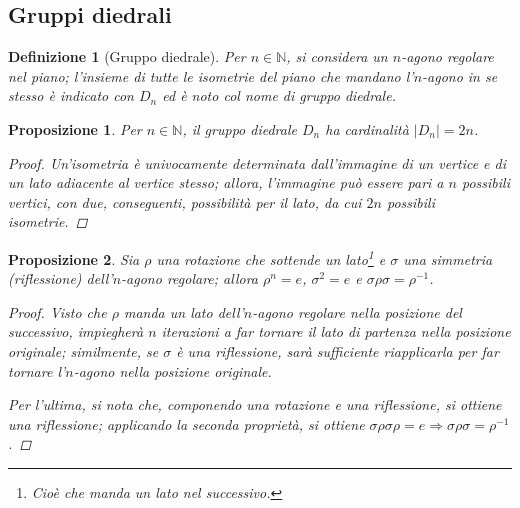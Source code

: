 \documentclass[11pt]{scrartcl}
\theoremstyle{style1}
\newtheorem{prop}{Proposizione}[section]
\newtheorem{definizione}{Definizione}[section]
\numberwithin{equation}{subsection}
\begin{document}
\subsection{Gruppi diedrali}
\begin{definizione}
	[Gruppo diedrale]
	Per $n \in \mathbb{N}$, si considera un $n$-agono regolare nel piano; l'insieme di tutte le isometrie del piano che mandano l'$n$-agono in se stesso \`e indicato con $D_n$ ed \`e noto col nome di \textit{gruppo diedrale}.
\end{definizione}
\begin{prop}
	Per $n \in \mathbb{N}$, il gruppo diedrale $D_n$ ha cardinalit\`a $\lvert D_n \rvert = 2n$.
	\begin{proof}
		Un'isometria \`e univocamente determinata dall'immagine di un vertice e di un lato adiacente al vertice stesso; allora, l'immagine pu\`o essere pari a $n$ possibili vertici, con due, conseguenti, possibilit\`a per il lato, da cui $2n$ possibili isometrie.
	\end{proof}
\end{prop}
\begin{prop}
	Sia $\rho $ una rotazione che sottende un lato\footnote{Cioè che manda un lato nel successivo.} e $\sigma $ una simmetria (riflessione) dell'$n$-agono regolare; allora $\rho ^n = e$, $\sigma ^2 =e$ e $\sigma \rho \sigma = \rho ^{-1} $.
	\begin{proof}
		Visto che $\rho $ manda un lato dell'$n$-agono regolare nella posizione del successivo, impiegher\`a $n$ iterazioni a far tornare il lato di partenza nella posizione originale; similmente, se $\sigma $ \`e una riflessione, sar\`a sufficiente riapplicarla per far tornare l'$n$-agono nella posizione originale.

		Per l'ultima, si nota che, componendo una rotazione e una riflessione, si ottiene una riflessione; applicando la seconda propriet\`a, si ottiene $\sigma \rho \sigma \rho = e \Rightarrow \sigma \rho \sigma  = \rho ^{-1} $.
	\end{proof}
\end{prop}
\end{document}
